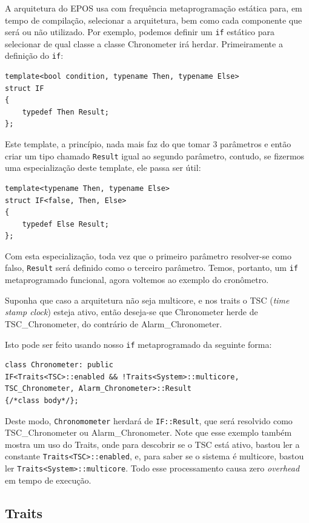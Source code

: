 A arquitetura do EPOS usa com frequência metaprogramação estática para, em tempo de compilação, selecionar a arquitetura, bem como cada componente que será ou não utilizado. Por exemplo, podemos definir um \verb+if+ estático para selecionar de qual classe a classe Chronometer irá herdar. Primeiramente a definição do \verb+if+:

\begin{lstlisting}
template<bool condition, typename Then, typename Else>
struct IF
{
    typedef Then Result;
};
\end{lstlisting}

Este template, a princípio, nada mais faz do que tomar 3 parâmetros e então criar um tipo chamado \verb+Result+ igual ao segundo parâmetro, contudo, se fizermos uma especialização deste template, ele passa ser útil:

\begin{lstlisting}
template<typename Then, typename Else>
struct IF<false, Then, Else>
{
    typedef Else Result;
};
\end{lstlisting}


Com esta especialização, toda vez que o primeiro parâmetro resolver-se como falso, \verb+Result+ será definido como o terceiro parâmetro. Temos, portanto, um \verb+if+ metaprogramado funcional, agora voltemos ao exemplo do cronômetro.

Suponha que caso a arquitetura não seja multicore, e nos traits o TSC (\emph{time stamp clock}) esteja ativo, então deseja-se que Chronometer herde de TSC\_Chronometer, do contrário de Alarm\_Chronometer.

Isto pode ser feito usando nosso \verb+if+ metaprogramado da seguinte forma:

\begin{lstlisting}
class Chronometer: public
IF<Traits<TSC>::enabled && !Traits<System>::multicore,
TSC_Chronometer, Alarm_Chronometer>::Result
{/*class body*/};
\end{lstlisting}

Deste modo, \verb+Chronomometer+ herdará de \verb+IF::Result+, que será resolvido como TSC\_Chronometer ou Alarm\_Chronometer. Note que esse exemplo também mostra um uso do Traits, onde para descobrir se o TSC está ativo, bastou ler a constante \verb+Traits<TSC>::enabled+, e, para saber se o sistema é multicore, bastou ler \verb+Traits<System>::multicore+. Todo esse processamento causa zero \emph{overhead} em tempo de execução.

\subsection{Traits}

